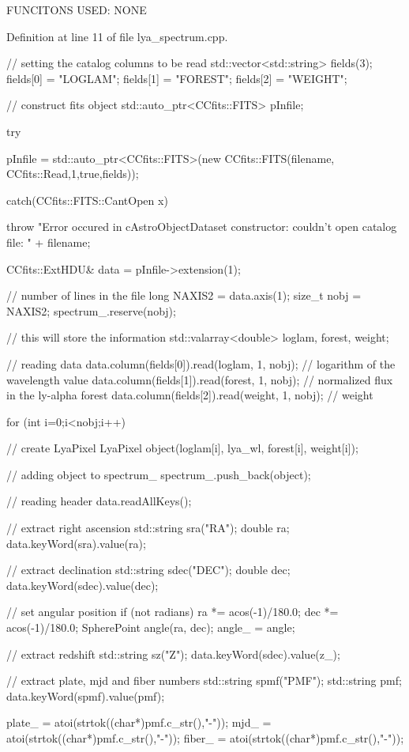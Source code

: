 F\-U\-N\-C\-I\-T\-O\-N\-S U\-S\-E\-D\-: N\-O\-N\-E

Definition at line 11 of file lya\-\_\-spectrum.\-cpp.


\begin{DoxyCode}
                                                                               
                  {
    // setting the catalog columns to be read
    std::vector<std::string> fields(3);
    fields[0] = "LOGLAM";
    fields[1] = "FOREST";
    fields[2] = "WEIGHT";
    

    // construct fits object
    std::auto_ptr<CCfits::FITS> pInfile; 
    
    try{
        
        pInfile = std::auto_ptr<CCfits::FITS>(new CCfits::FITS(filename,
      CCfits::Read,1,true,fields));
        
    } catch(CCfits::FITS::CantOpen x) {
        
        throw "Error occured in cAstroObjectDataset constructor: couldn't open
       catalog file: " + filename;
    }
    CCfits::ExtHDU& data = pInfile->extension(1);
    
    // number of lines in the file
    long NAXIS2 = data.axis(1);
    size_t nobj = NAXIS2;
    spectrum_.reserve(nobj);
    
    // this will store the information
    std::valarray<double> loglam, forest, weight;
    
    // reading data
    data.column(fields[0]).read(loglam, 1, nobj); // logarithm of the
       wavelength value
    data.column(fields[1]).read(forest, 1, nobj); // normalized flux in the
       ly-alpha forest
    data.column(fields[2]).read(weight, 1, nobj); // weight
    
    for (int i=0;i<nobj;i++){
        // create LyaPixel
        LyaPixel object(loglam[i], lya_wl, forest[i], weight[i]);
            
        // adding object to spectrum_
        spectrum_.push_back(object);
    }
    
    // reading header
    data.readAllKeys();
    
    // extract right ascension
    std::string sra("RA");
    double ra;
    data.keyWord(sra).value(ra);
     
    // extract declination
    std::string sdec("DEC");
    double dec;
    data.keyWord(sdec).value(dec);
     
    // set angular position
    if (not radians){
        ra *= acos(-1)/180.0;
        dec *= acos(-1)/180.0;
    }
    SpherePoint angle(ra, dec);
    angle_ = angle;
    
    // extract redshift
    std::string sz("Z");
    data.keyWord(sdec).value(z_);
    
    // extract plate, mjd and fiber numbers
    std::string spmf("PMF");
    std::string pmf;
    data.keyWord(spmf).value(pmf);
    
    plate_ = atoi(strtok((char*)pmf.c_str(),"-"));
    mjd_ = atoi(strtok((char*)pmf.c_str(),"-"));
    fiber_ = atoi(strtok((char*)pmf.c_str(),"-"));

}
\end{DoxyCode}


